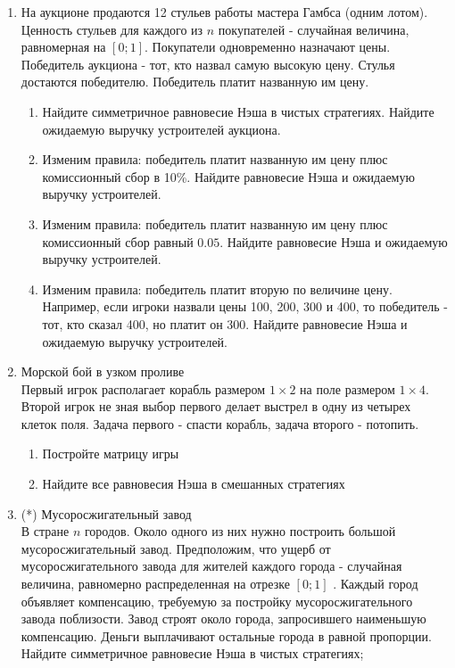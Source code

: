 \documentclass[pdftex,12pt,a4paper]{article}
\begin{document}
\begin{enumerate}
\item На аукционе продаются 12 стульев работы мастера Гамбса (одним лотом). Ценность стульев для каждого из $n$ покупателей - случайная величина, равномерная на $[0;1]$. Покупатели одновременно назначают цены. Победитель аукциона - тот, кто назвал самую высокую цену. Стулья достаются победителю. Победитель платит названную им цену. 
\begin{enumerate}
\item Найдите симметричное равновесие Нэша в чистых стратегиях. Найдите ожидаемую выручку устроителей аукциона. 
\item Изменим правила: победитель платит названную им цену плюс комиссионный сбор в 10\%. Найдите равновесие Нэша и ожидаемую выручку устроителей. 
\item Изменим правила: победитель платит названную им цену плюс комиссионный сбор равный $0.05$. Найдите равновесие Нэша и ожидаемую выручку устроителей. 
\item Изменим правила: победитель платит вторую по величине цену. Например, если игроки назвали цены 100, 200, 300 и 400, то победитель - тот, кто сказал 400, но платит он 300. Найдите равновесие Нэша и ожидаемую выручку устроителей. 
\end{enumerate}

\item Морской бой в узком проливе \\
Первый игрок располагает корабль размером $1\times 2$ на поле размером $1\times 4$. Второй игрок не зная выбор первого делает выстрел в одну из четырех клеток поля. Задача первого - спасти корабль, задача второго - потопить. 
\begin{enumerate}
\item Постройте матрицу игры 
\item Найдите все равновесия Нэша в смешанных стратегиях 
\end{enumerate}

\item (*) Мусоросжигательный завод \\
В стране  $n$  городов. Около одного из них нужно построить большой мусоросжигательный завод. Предположим, что ущерб от мусоросжигательного завода для жителей каждого города - случайная величина, равномерно распределенная на отрезке  $\left[0;1\right]$ . Каждый город объявляет компенсацию, требуемую за постройку мусоросжигательного завода поблизости. Завод строят около города, запросившего наименьшую компенсацию. Деньги выплачивают остальные города в равной пропорции.\\
Найдите симметричное равновесие Нэша в чистых стратегиях;


\end{enumerate}
\end{document}
